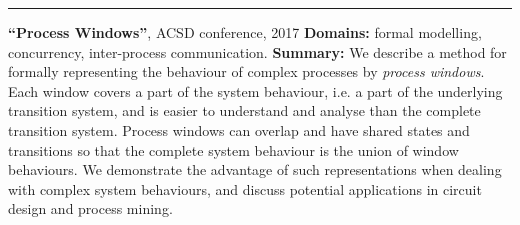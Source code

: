 \begin{cventries}
\rule{8cm}{0.5pt}\vspace{-3mm}
\cventry
{}
{}
{}
{}
{
\begin{cvitems}
\item{\textbf{``Process Windows''}, ACSD conference, 2017\newline}
\textbf{Domains:} formal modelling, concurrency, inter-process 
communication.\newline
\textbf{Summary:} We describe a method for formally representing the behaviour 
of complex processes by \textit{process windows}. Each window covers a part of 
the system behaviour, i.e. a part of the underlying transition system, and is 
easier to understand and analyse than the complete transition system. Process 
windows can overlap and have shared states and transitions so that the complete 
system behaviour is the union of window behaviours. We demonstrate the 
advantage of such representations when dealing with complex system behaviours, 
and discuss potential applications in circuit design and process mining.
\iffalse
\newline
\hspace{+4mm}As a motivational example we consider the problem of covering
transition systems by marked graphs, or more generally choice-free Petri nets. 
The obtained windows correspond to choice-free behavioural scenarios of the 
system, wherein one window can take over, or wake up, after another window has 
become inactive. The corresponding wake-up conditions and wake-up markings can 
be derived automatically.
\fi
\end{cvitems}
}


\end{cventries}
